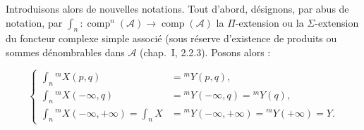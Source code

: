 Introduisons alors de nouvelles notations. Tout d'abord, désignons, par
abus de notation, par
$\int_n\colon\operatorname{comp}^n(\mathcal A)\longrightarrow
\operatorname{comp}(\mathcal A)$ la $\Pi$-extension ou la
$\Sigma$-extension du foncteur complexe simple associé (sous réserve
d'existence de produits ou sommes dénombrables dans $\mathcal A$
(chap.~I, 2.2.3). Posons alors :

\begin{equation}
\left\{
\begin{aligned}
\int_n{}^{m}\!X(p,q)
  &={}^{m}\!Y(p,q),\\
\int_n{}^{m}\!X(-\infty,q)
  &={}^{m}\!Y(-\infty,q)={}^{m}\!Y(q),\\
\int_n{}^{m}\!X(-\infty,+\infty)=\int_n X
  &={}^{m}\!Y(-\infty,+\infty)={}^{m}\!Y(+\infty)=Y.
\end{aligned}
\right.
\tag{4.1.6.5}
\end{equation}
\endgroup
